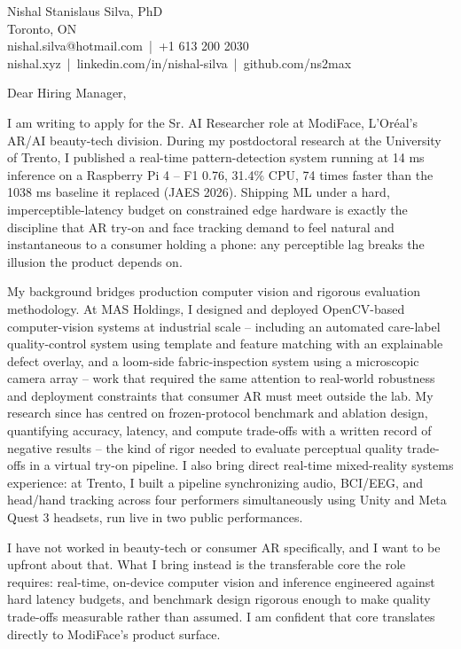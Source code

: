 \documentclass[11pt]{article}
\begin{document}
\pagestyle{empty}

\noindent
Nishal Stanislaus Silva, PhD \\
Toronto, ON \\
nishal.silva@hotmail.com \,|\, +1 613 200 2030 \\
nishal.xyz \,|\, linkedin.com/in/nishal-silva \,|\, github.com/ns2max

\vspace{1.5em}
\noindent
Dear Hiring Manager,

\vspace{1em}
\noindent
I am writing to apply for the Sr. AI Researcher role at ModiFace, L'Or\'eal's AR/AI beauty-tech division. During my postdoctoral research at the University of Trento, I published a real-time pattern-detection system running at 14 ms inference on a Raspberry Pi 4 -- F1 0.76, 31.4\% CPU, 74 times faster than the 1038 ms baseline it replaced (JAES 2026). Shipping ML under a hard, imperceptible-latency budget on constrained edge hardware is exactly the discipline that AR try-on and face tracking demand to feel natural and instantaneous to a consumer holding a phone: any perceptible lag breaks the illusion the product depends on.

\vspace{1em}
\noindent
My background bridges production computer vision and rigorous evaluation methodology. At MAS Holdings, I designed and deployed OpenCV-based computer-vision systems at industrial scale -- including an automated care-label quality-control system using template and feature matching with an explainable defect overlay, and a loom-side fabric-inspection system using a microscopic camera array -- work that required the same attention to real-world robustness and deployment constraints that consumer AR must meet outside the lab. My research since has centred on frozen-protocol benchmark and ablation design, quantifying accuracy, latency, and compute trade-offs with a written record of negative results -- the kind of rigor needed to evaluate perceptual quality trade-offs in a virtual try-on pipeline. I also bring direct real-time mixed-reality systems experience: at Trento, I built a pipeline synchronizing audio, BCI/EEG, and head/hand tracking across four performers simultaneously using Unity and Meta Quest 3 headsets, run live in two public performances.

\vspace{1em}
\noindent
I have not worked in beauty-tech or consumer AR specifically, and I want to be upfront about that. What I bring instead is the transferable core the role requires: real-time, on-device computer vision and inference engineered against hard latency budgets, and benchmark design rigorous enough to make quality trade-offs measurable rather than assumed. I am confident that core translates directly to ModiFace's product surface.
\end{document}
